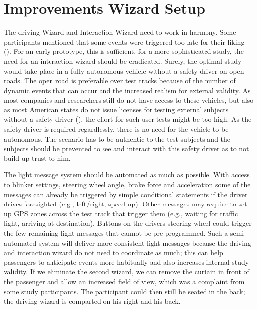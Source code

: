 \section{Improvements Wizard Setup}
\label{ImproveWizard}
The driving Wizard and Interaction Wizard need to work in harmony. Some participants mentioned that some events were triggered too late for their liking (\emph{}). For an early prototype, this is sufficient, for a more sophisticated study, the need for an interaction wizard should be eradicated. Surely, the optimal study would take place in a fully autonomous vehicle without a safety driver on open roads. The open road is preferable over test tracks because of the number of dynamic events that can occur and the increased realism for external validity. As most companies and researchers still do not have access to these vehicles, but also as most American states do not issue licenses for testing external subjects without a safety driver (\emph{}), the effort for such user tests might be too high. As the safety driver is required regardlessly, there is no need for the vehicle to be autonomous. The scenario has to be authentic to the test subjects and the subjects should be prevented to see and interact with this safety driver as to not build up trust to him. 

The light message system should be automated as much as possible. With access to blinker settings, steering wheel angle, brake force and acceleration some of the messages can already be triggered by simple conditional statements if the driver drives foresighted (e.g., left/right, speed up). Other messages may require to set up GPS zones across the test track that trigger them (e.g., waiting for traffic light, arriving at destination). Buttons on the drivers steering wheel could trigger the few remaining light messages that cannot be pre-programmed. Such a semi-automated system will deliver more consistent light messages because the driving and interaction wizard do not need to coordinate as much; this can help passengers to anticipate events more habitually and also increases internal study validity. If we eliminate the second wizard, we can remove the curtain in front of the passenger and allow an increased field of view, which was a complaint from some study participants. The participant could then still be seated in the back; the driving wizard is comparted on his right and his back.  

